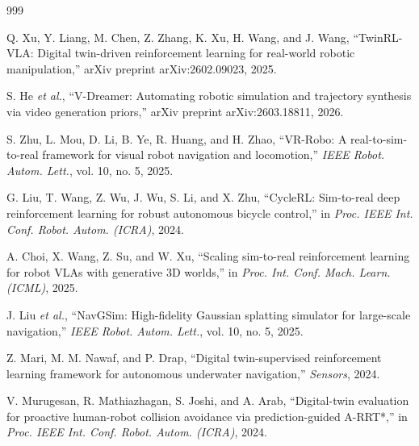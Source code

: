 \documentclass[12pt,a4paper,oneside]{report}
\begin{document}
\begin{thebibliography}{999}

Q. Xu, Y. Liang, M. Chen, Z. Zhang, K. Xu, H. Wang, and J. Wang, ``{TwinRL-VLA}: Digital twin-driven reinforcement learning for real-world robotic manipulation,'' arXiv preprint arXiv:2602.09023, 2025.




S. He \textit{et al.}, ``{V-Dreamer}: Automating robotic simulation and trajectory synthesis via video generation priors,'' arXiv preprint arXiv:2603.18811, 2026.




S. Zhu, L. Mou, D. Li, B. Ye, R. Huang, and H. Zhao, ``{VR-Robo}: A real-to-sim-to-real framework for visual robot navigation and locomotion,'' \textit{IEEE Robot. Autom. Lett.}, vol. 10, no. 5, 2025.




G. Liu, T. Wang, Z. Wu, J. Wu, S. Li, and X. Zhu, ``{CycleRL}: Sim-to-real deep reinforcement learning for robust autonomous bicycle control,'' in \textit{Proc. IEEE Int. Conf. Robot. Autom. (ICRA)}, 2024.




A. Choi, X. Wang, Z. Su, and W. Xu, ``Scaling sim-to-real reinforcement learning for robot VLAs with generative 3D worlds,'' in \textit{Proc. Int. Conf. Mach. Learn. (ICML)}, 2025.




J. Liu \textit{et al.}, ``{NavGSim}: High-fidelity Gaussian splatting simulator for large-scale navigation,'' \textit{IEEE Robot. Autom. Lett.}, vol. 10, no. 5, 2025.




Z. Mari, M. M. Nawaf, and P. Drap, ``Digital twin-supervised reinforcement learning framework for autonomous underwater navigation,'' \textit{Sensors}, 2024.




V. Murugesan, R. Mathiazhagan, S. Joshi, and A. Arab, ``Digital-twin evaluation for proactive human-robot collision avoidance via prediction-guided A-RRT*,'' in \textit{Proc. IEEE Int. Conf. Robot. Autom. (ICRA)}, 2024.




\end{thebibliography}
\end{document}
